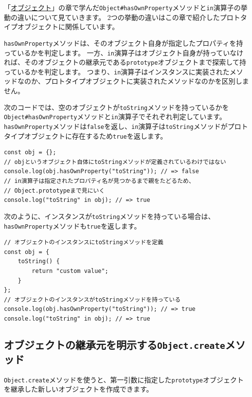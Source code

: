 「\hyperlink{object}{オブジェクト}」の章で学んだ\texttt{Object\#hasOwnProperty}メソッドと\texttt{in}演算子の挙動の違いについて見ていきます。
2つの挙動の違いはこの章で紹介したプロトタイプオブジェクトに関係しています。

\texttt{hasOwnProperty}メソッドは、そのオブジェクト自身が指定したプロパティを持っているかを判定します。
一方、\texttt{in}演算子はオブジェクト自身が持っていなければ、そのオブジェクトの継承元である\texttt{prototype}オブジェクトまで探索して持っているかを判定します。
つまり、\texttt{in}演算子はインスタンスに実装されたメソッドなのか、プロトタイプオブジェクトに実装されたメソッドなのかを区別しません。

次のコードでは、空のオブジェクトが\texttt{toString}メソッドを持っているかを\texttt{Object\#hasOwnProperty}メソッドと\texttt{in}演算子でそれぞれ判定しています。
\texttt{hasOwnProperty}メソッドは\texttt{false}を返し、\texttt{in}演算子は\texttt{toString}メソッドがプロトタイプオブジェクトに存在するため\texttt{true}を返します。

\begin{lstlisting}
const obj = {};
// objというオブジェクト自体にtoStringメソッドが定義されているわけではない
console.log(obj.hasOwnProperty("toString")); // => false
// in演算子は指定されたプロパティ名が見つかるまで親をたどるため、
// Object.prototypeまで見にいく
console.log("toString" in obj); // => true
\end{lstlisting}

次のように、インスタンスが\texttt{toString}メソッドを持っている場合は、\texttt{hasOwnProperty}メソッドも\texttt{true}を返します。

\begin{lstlisting}
// オブジェクトのインスタンスにtoStringメソッドを定義
const obj = {
    toString() {
        return "custom value";
    }
};
// オブジェクトのインスタンスがtoStringメソッドを持っている
console.log(obj.hasOwnProperty("toString")); // => true
console.log("toString" in obj); // => true
\end{lstlisting}

\hypertarget{create-method}{%
\subsection{\texorpdfstring{オブジェクトの継承元を明示する\texttt{Object.create}メソッド}{オブジェクトの継承元を明示するObject.createメソッド}}\label{create-method}}

\texttt{Object.create}メソッドを使うと、第一引数に指定した\texttt{prototype}オブジェクトを継承した新しいオブジェクトを作成できます。


